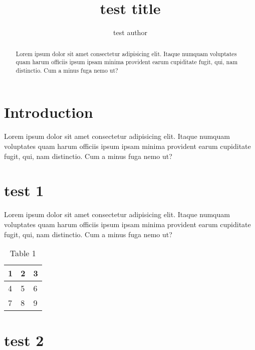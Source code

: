 \documentclass[preprint,12pt]{elsarticle}
\begin{document}
\begin{frontmatter}

\title{ test title }


\author[aff1]{ test author }



\address[aff1]{ test affiliation }


\begin{abstract}
Lorem ipsum dolor sit amet consectetur adipisicing elit. Itaque numquam voluptates quam harum officiis ipsum ipsam minima provident earum cupiditate fugit, qui, nam distinctio. Cum a minus fuga nemo ut?
\end{abstract}

\begin{keyword}

\end{keyword}

\end{frontmatter}


\section*{ Introduction }

Lorem ipsum dolor sit amet consectetur adipisicing elit. Itaque numquam voluptates quam harum officiis ipsum ipsam minima provident earum cupiditate fugit, qui, nam distinctio. Cum a minus fuga nemo ut?


\section*{ test 1 }

Lorem ipsum dolor sit amet consectetur adipisicing elit. Itaque numquam voluptates quam harum officiis ipsum ipsam minima provident earum cupiditate fugit, qui, nam distinctio. Cum a minus fuga nemo ut?
\begin{table}[ht]
    \centering
    \begin{tabular}{lll}
        \toprule
        \textbf{1} & \textbf{2} & \textbf{3} \\
        \midrule
        4 & 5 & 6 \\
        7 & 8 & 9 \\
        \bottomrule
    \end{tabular}
    \caption{Table 1}
    \vspace{1em}
\end{table}


\section*{ test 2 }
\end{document}
